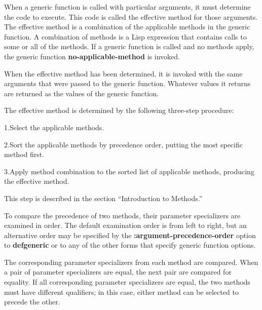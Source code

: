 When a generic function is called with particular arguments, it must
determine the code to execute.  This code is called the {\bit effective
method\/} for those arguments.  The effective method is a {\bit
combination\/} of the applicable methods in the generic function.  A
combination of methods is a Lisp expression that contains calls to some or
all of the methods.  If a generic function is
called and no methods apply, the generic function {\bf
no-applicable-method} is invoked.

When the effective method has been determined, it is invoked with the same
arguments that were passed to the generic function.  Whatever values it
returns are returned as the values of the generic function.


The effective method is determined by the following three-step procedure:

\beginlist

\item{1.}{Select the applicable methods.}

\item{2.}{Sort the applicable methods by precedence order, putting
the most specific method first.}

\item{3.}{Apply method combination to the sorted list of
applicable methods, producing the effective method.}

\endlist


This step is described in the section ``Introduction to Methods.''

\endsubsubsection%


To compare the precedence of two methods, their parameter specializers
are examined in order.  The default examination order is from left to
right, but an alternative order may be specified by the {\bf
:argument-precedence-order} option to {\bf defgeneric} or to any of
the other forms that specify generic function options.

The corresponding parameter specializers from each method are
compared.  When a pair of parameter specializers are equal, the next
pair are compared for equality.  If all corresponding parameter
specializers are equal, the two methods must have different
qualifiers; in this case, either method can be selected to precede the
other.

